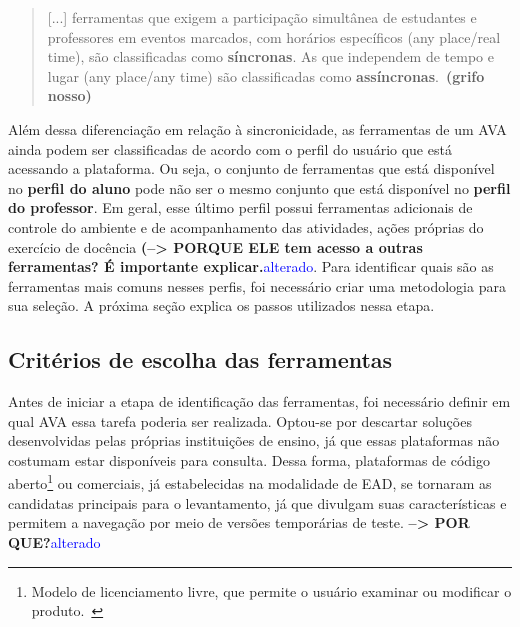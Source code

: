 \begin{quote}
[...] ferramentas que exigem a participação simultânea de estudantes e professores em eventos marcados, com horários específicos (any place/real time), são classificadas como \textbf{síncronas}. As que independem de tempo e lugar (any place/any time) são classificadas como \textbf{assíncronas}.~\cite{dotta@ead}\textbf{(grifo nosso)}
\end{quote}

Além dessa diferenciação em relação à sincronicidade, as ferramentas de um AVA ainda podem ser classificadas de acordo com o perfil do usuário que está acessando a plataforma. Ou seja, o conjunto de ferramentas que está disponível no \textbf{perfil do aluno} pode não ser o mesmo conjunto que está disponível no \textbf{perfil do professor}. Em geral, esse último perfil possui ferramentas adicionais de controle do ambiente e de acompanhamento das atividades, ações próprias do exercício de docência \textbf{(--> PORQUE ELE tem acesso a outras ferramentas? É importante explicar.}\textcolor{blue}{alterado}. Para identificar quais são as ferramentas mais comuns nesses perfis, foi necessário criar uma metodologia para sua seleção. A próxima seção explica os passos utilizados nessa etapa.


\subsection{Critérios de escolha das ferramentas}%


Antes de iniciar a etapa de identificação das ferramentas, foi necessário definir em qual AVA essa tarefa poderia ser realizada. Optou-se por descartar soluções desenvolvidas pelas próprias instituições de ensino, já que essas plataformas não costumam estar disponíveis para consulta. Dessa forma, plataformas de código aberto\footnote{Modelo de licenciamento livre, que permite o usuário examinar ou modificar o produto.~\cite{brasilportaria}} ou comerciais, já estabelecidas na modalidade de EAD, se tornaram as candidatas principais para o levantamento, já que divulgam suas características e permitem a navegação por meio de versões temporárias de teste. \textbf{--> POR QUE?}\textcolor{blue}{alterado}

